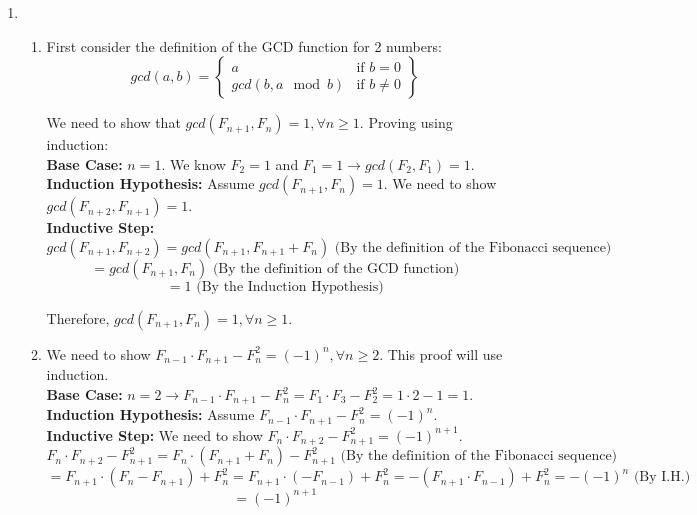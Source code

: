 \documentclass[a4paper]{article}
\begin{document}
\begin{enumerate}
    \item \begin{enumerate}
        \item First consider the definition of the GCD function for 2 numbers:\\
        \[
            gcd(a,b) = 
            \left\{
                \begin{array}{lr}
                    a & \text{if } b = 0 \\
                    gcd(b, a \mod b) & \text{if } b \ne 0
                \end{array}
                \right\}
        \]

        We need to show that $gcd(F_{n+1}, F_n) = 1, \forall n \ge 1$. Proving using induction: \\

        \textbf{Base Case:} $n = 1$. We know $F_2 = 1$ and $F_1 = 1 \rightarrow gcd(F_2, F_1) = 1$. \\

        \textbf{Induction Hypothesis:} Assume $gcd(F_{n+1}, F_n) = 1$. We need to show $gcd(F_{n+2}, F_{n+1}) = 1$. \\
        
        \textbf{Inductive Step:} 
        \[ gcd(F_{n+1}, F_{n+2}) = gcd(F_{n+1}, F_{n+1} + F_n) \text{ (By the definition of the Fibonacci sequence)} \]
        \[ = gcd(F_{n+1}, F_n) \text{ (By the definition of the GCD function)} \]
        \[ = 1 \text{ (By the Induction Hypothesis)} \]
        
        Therefore, $gcd(F_{n+1}, F_n) = 1, \forall n \ge 1$. \\

        \item We need to show $F_{n-1} \cdot F_{n+1} - F_n^2 = (-1)^n, \forall n \ge 2$. This proof will use induction. \\
        
        \textbf{Base Case:} $n = 2 \rightarrow F_{n-1} \cdot F_{n+1} - F_n^2 = F_1 \cdot F_3 - F_2^2 = 1 \cdot 2 - 1 = 1$. \\

        \textbf{Induction Hypothesis:} Assume $F_{n-1} \cdot F_{n+1} - F_n^2 = (-1)^n$. \\

        \textbf{Inductive Step:} We need to show $F_{n} \cdot F_{n+2} - F_{n+1}^2 = (-1)^{n+1}$. \\
        \[ F_{n} \cdot F_{n+2} - F_{n+1}^2 = F_{n} \cdot (F_{n+1} + F_{n}) - F_{n+1}^2 \text{ (By the definition of the Fibonacci sequence)} \]
        \[ = F_{n+1} \cdot (F_{n} - F_{n+1}) + F_{n}^2  = F_{n+1} \cdot (-F_{n-1}) + F_{n}^2 = -(F_{n+1} \cdot F_{n-1}) + F_{n}^2 = -(-1)^n \text{ (By I.H.)} \]
        \[ = (-1)^{n+1} \]


\end{enumerate}
\end{enumerate}
\end{document}
